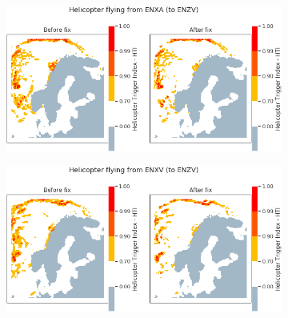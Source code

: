 \begin{figure}[H]
    \begin{subfigure}{0.45\textwidth}
    \centering
    \includegraphics[width=\textwidth]{Figures/Analysis00.png}
    \caption{}
    \label{fig:HTIA00}
    \end{subfigure}
\hfill
    \begin{subfigure}{0.45\textwidth}
    \centering
    \includegraphics[width=\textwidth]{Figures/Analysis01.png}
    \caption{}
    \label{fig:HTIA01}
    \end{subfigure}


\end{figure}
